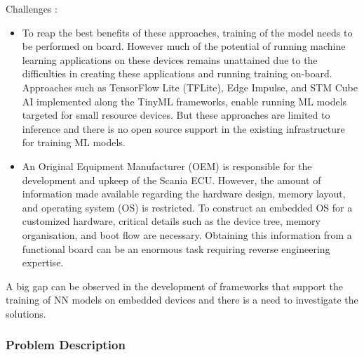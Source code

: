 Challenges :
\begin{itemize}
	\item To reap the best benefits of these approaches, training of the model needs to be performed on board. However much of the potential of running machine learning applications on these devices remains unattained due to the difficulties in creating these applications and running training on-board. Approaches such as TensorFlow Lite (TFLite), Edge Impulse, and STM Cube AI implemented along the TinyML frameworks, enable running ML models targeted for small resource devices. But these approaches are limited to inference and there is no open source support in the existing infrastructure for training ML models.

	\item An Original Equipment Manufacturer (OEM) is responsible for the development and upkeep of the Scania ECU. However, the amount of information made available regarding the hardware design, memory layout, and operating system (OS) is restricted. To construct an embedded OS for a customized hardware, critical details such as the device tree, memory organisation, and boot flow are necessary. Obtaining this information from a functional board can be an enormous task requiring reverse engineering expertise. 
\end{itemize}

A big gap can be observed in the development of frameworks that support the training of NN models on embedded devices and there is a need to investigate the solutions. 



\subsubsection{Problem Description}

